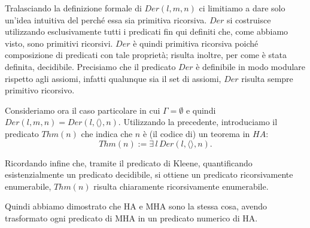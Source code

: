 Tralasciando la definizione formale di $Der(l,m,n)$ ci limitiamo a dare solo un'idea intuitiva del perch\'e essa sia primitiva ricorsiva. $Der$ si costruisce utilizzando esclusivamente tutti i predicati fin qui definiti che, come ab\-bia\-mo visto, sono primitivi ricorsivi.  $Der$ \`e quindi primitiva ricorsiva poich\'e composizione di predicati con tale propriet\`a; risulta inoltre, per come \`e stata definita, decidibile.
Precisiamo che il predicato $Der$ \`e definibile in modo modulare rispetto agli assiomi, infatti qualunque sia il set di assiomi, $Der$ risulta sempre primitivo ricorsivo.

Consideriamo ora il caso particolare in cui  $\Gamma = \emptyset$ e quindi $Der(l,m,n)=Der(l,\langle \rangle,n)$.
Utilizzando la precedente, introduciamo il predicato $Thm(n)$ che indica che $n$ \`e (il codice di) un teorema in $HA$:
$$
Thm(n) := \exists \, l \, Der(l,\langle \rangle,n) .
$$

Ricordando infine che, tramite il predicato di Kleene, quantificando esistenzialmente un predicato decidibile, si ottiene un predicato ricorsivamente enumerabile, $Thm(n)$ risulta chiaramente ricorsivamente enumerabile.

Quindi abbiamo dimostrato che HA e MHA sono la stessa cosa, avendo trasformato ogni predicato di MHA in un predicato numerico di HA.
